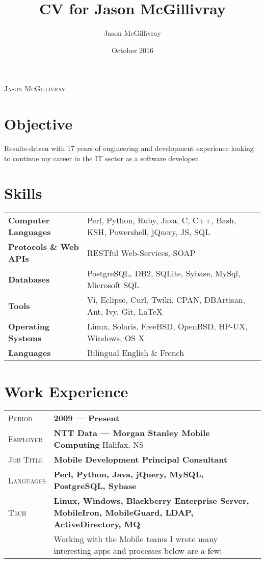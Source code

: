 \documentclass[a4paper, oneside, final]{scrartcl}
\title{CV for Jason McGillivray}
\author{Jason McGillivray}
\date {October 2016}
\newcommand{\gray}{\rowcolor[gray]{.90}}
\begin{document}
\begin{center} %


{\fontsize{20}{20}\selectfont\scshape Jason McGillivray} %

\vspace{.3cm} %


\section{Objective}
Results-driven with 17 years of engineering and development experience looking to continue my career in the IT sector as a software developer.


\section{Skills}

\begin{tabular}{ @{} >{\bfseries}l @{\hspace{6ex}} l }
Computer Languages & Perl, Python, Ruby, Java, C, C++, Bash, KSH, Powershell, jQuery, JS, SQL \\
Protocols \& Web APIs & RESTful Web-Services, SOAP\\
Databases & PostgreSQL, DB2, SQLite, Sybase, MySql, Microsoft SQL \\
Tools & Vi, Eclipse, Curl, Twiki, CPAN, DBArtisan, Ant, Ivy, Git, LaTeX\\
Operating Systems & Linux, Solaris, FreeBSD, OpenBSD, HP-UX, Windows, OS X\\
Languages & Bilingual English \& French\\
\end{tabular}


\section{Work Experience}

\begin{tabularx}{0.97\linewidth}{>{\raggedleft\scshape}p{2cm}X}
\gray Period & \textbf{2009 --- Present}\\
\gray Employer & \textbf{NTT Data --- Morgan Stanley Mobile Computing} \hfill Halifax, NS\\
\gray Job Title & \textbf{Mobile Development Principal Consultant}\\
\gray Languages & \textbf{Perl, Python, Java, jQuery, MySQL, PostgreSQL, Sybase}\\
\gray Tech & \textbf{Linux, Windows, Blackberry Enterprise Server, MobileIron, MobileGuard, LDAP, ActiveDirectory, MQ}\\
& Working with the Mobile teams I wrote many interesting apps and processes below are a few:


\end{tabularx}
\end{center}
\end{document}
